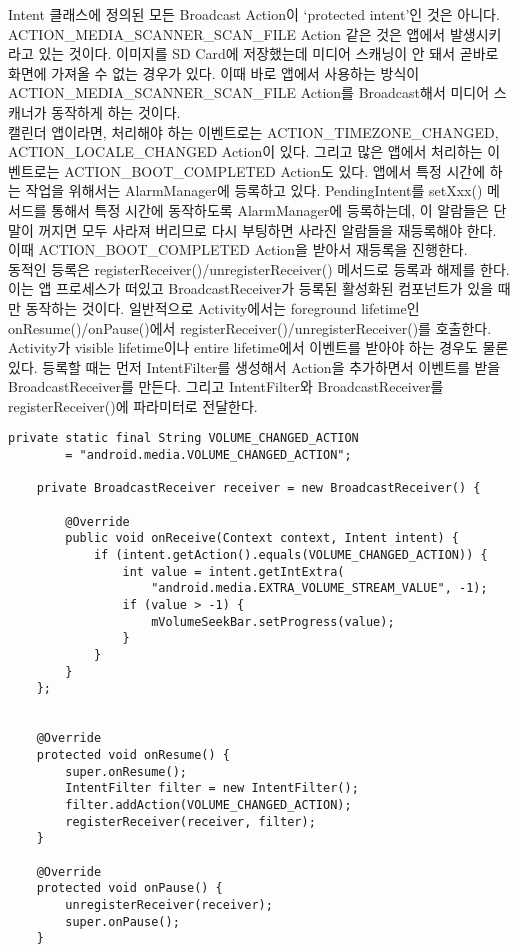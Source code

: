 Intent 클래스에 정의된 모든 Broadcast Action이 `protected intent'인 것은 아니다.
ACTION\_MEDIA\_SCA\-NNER\_SC\-AN\_FI\-LE Action 같은 것은 앱에서 발생시키라고 있는 것이다.
이미지를 SD Card에 저장했는데 미디어 스캐닝이 안 돼서 곧바로 화면에 가져올 수 없는 경우가 있다.
이때 바로 앱에서 사용하는 방식이 ACTION\_MEDIA\_SCANNER\_SCAN\_FILE Action를 Broadcast해서 미디어 스캐너가 동작하게 하는 것이다.\\

캘린더 앱이라면, 처리해야 하는 이벤트로는 ACTION\_TIMEZONE\_CHANGED,
ACTION\_LOCALE\_C\-HANG\-ED Action이 있다.
그리고 많은 앱에서 처리하는 이벤트로는 ACTION\_BOOT\_COMPLETED Action도 있다. 
앱에서 특정 시간에 하는 작업을 위해서는 AlarmManager에 등록하고 있다.
PendingIntent를 setXxx() 메서드를 통해서 특정 시간에 동작하도록 AlarmManager에 등록하는데, 이 알람들은 단말이 꺼지면 모두 사라져 버리므로 다시 부팅하면 사라진 알람들을 재등록해야 한다. 이때 ACTION\_BOOT\_COMPLETED Action을 받아서 재등록을 진행한다.\\

동적인 등록은 registerReceiver()/unregisterReceiver() 메서드로 등록과 해제를 한다. 이는 앱 프로세스가 떠있고 BroadcastReceiver가 등록된 활성화된 컴포넌트가 있을 때만 동작하는 것이다.
일반적으로 Activity에서는 foreground lifetime인 onResume()/onPause()에서 registerReceiver()/unregisterReceiver()를 호출한다.
Activity가 visible lifetime이나 entire lifetime에서 이벤트를 받아야 하는 경우도 물론 있다.
등록할 때는 먼저 IntentFilter를 생성해서 Action을 추가하면서 이벤트를 받을 BroadcastReceiver를 만든다. 
그리고 IntentFilter와 BroadcastReceiver를 registerReceiver()에 파라미터로 전달한다.
\begin{lstlisting}[frame=single] 
	private static final String VOLUME_CHANGED_ACTION 
		= "android.media.VOLUME_CHANGED_ACTION";

	private BroadcastReceiver receiver = new BroadcastReceiver() {
		
		@Override
		public void onReceive(Context context, Intent intent) {
			if (intent.getAction().equals(VOLUME_CHANGED_ACTION)) {
				int value = intent.getIntExtra(
					"android.media.EXTRA_VOLUME_STREAM_VALUE", -1);
				if (value > -1) {
					mVolumeSeekBar.setProgress(value);
				}
			}
		}
	};
	

	@Override
	protected void onResume() {
		super.onResume();
		IntentFilter filter = new IntentFilter();
		filter.addAction(VOLUME_CHANGED_ACTION);
		registerReceiver(receiver, filter);
	}
	
	@Override
	protected void onPause() {
		unregisterReceiver(receiver);
		super.onPause();
	}	
\end{lstlisting}

